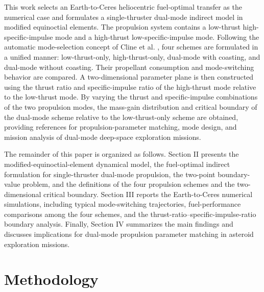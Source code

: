 ﻿\documentclass{IEEEtaes}
\begin{document}
This work selects an Earth-to-Ceres heliocentric fuel-optimal transfer as the numerical case and formulates a single-thruster dual-mode indirect model in modified equinoctial elements. The propulsion system contains a low-thrust high-specific-impulse mode and a high-thrust low-specific-impulse mode. Following the automatic mode-selection concept of Cline et al. \cite{cline2024a}, four schemes are formulated in a unified manner: low-thrust-only, high-thrust-only, dual-mode with coasting, and dual-mode without coasting. Their propellant consumption and mode-switching behavior are compared. A two-dimensional parameter plane is then constructed using the thrust ratio and specific-impulse ratio of the high-thrust mode relative to the low-thrust mode. By varying the thrust and specific-impulse combinations of the two propulsion modes, the mass-gain distribution and critical boundary of the dual-mode scheme relative to the low-thrust-only scheme are obtained, providing references for propulsion-parameter matching, mode design, and mission analysis of dual-mode deep-space exploration missions.

The remainder of this paper is organized as follows. Section II presents the modified-equinoctial-element dynamical model, the fuel-optimal indirect formulation for single-thruster dual-mode propulsion, the two-point boundary-value problem, and the definitions of the four propulsion schemes and the two-dimensional critical boundary. Section III reports the Earth-to-Ceres numerical simulations, including typical mode-switching trajectories, fuel-performance comparisons among the four schemes, and the thrust-ratio--specific-impulse-ratio boundary analysis. Finally, Section IV summarizes the main findings and discusses implications for dual-mode propulsion parameter matching in asteroid exploration missions.

\section{Methodology}
\end{document}
